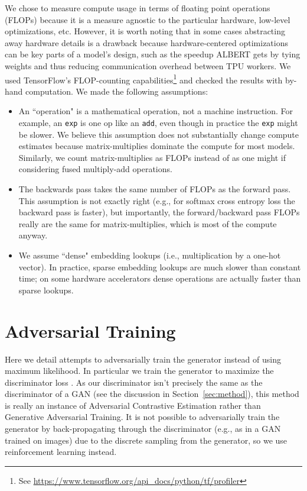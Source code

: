 \documentclass{article}
\begin{document}
We chose to measure compute usage in terms of floating point operations (FLOPs) because it is a measure agnostic to the particular hardware, low-level optimizations, etc. 
However, it is worth noting that in some cases abstracting away hardware details is a drawback because hardware-centered optimizations can be key parts of a model's design, such as the speedup ALBERT \citep{lan2019albert} gets by tying weights and thus reducing communication overhead between TPU workers. 
We used TensorFlow's FLOP-counting capabilities\footnote{See \url{https://www.tensorflow.org/api_docs/python/tf/profiler}} and checked the results with by-hand computation. We made the following assumptions: 
\begin{itemize}
    \item An ``operation" is a mathematical operation, not a machine instruction. For example, an \texttt{exp} is one op like an \texttt{add}, even though in practice the \texttt{exp} might be slower. We believe this assumption does not substantially change compute estimates because matrix-multiplies dominate the compute for most models. Similarly, we count matrix-multiplies as  FLOPs instead of  as one might if considering fused multiply-add operations. 
    \item The backwards pass takes the same number of FLOPs as the forward pass. This assumption is not exactly right (e.g., for softmax cross entropy loss the backward pass is faster), but importantly, the forward/backward pass FLOPs really are the same for matrix-multiplies, which is most of the compute anyway.
    \item We assume ``dense" embedding lookups (i.e., multiplication by a one-hot vector). In practice, sparse embedding lookups are much slower than constant time; on some hardware accelerators dense operations are actually faster than sparse lookups.
\end{itemize}


\section{Adversarial Training}
\label{app:adv}
Here we detail attempts to adversarially train the generator instead of using maximum likelihood.
In particular we train the generator  to maximize the discriminator loss .
As our discriminator isn't precisely the same as the discriminator of a GAN (see the discussion in Section~\ref{sec:method}), this method is really an instance of Adversarial Contrastive Estimation \citep{Bose2018AdversarialCE} rather than Generative Adversarial Training.
It is not possible to adversarially train the generator by back-propagating through the discriminator (e.g., as in a GAN trained on images) due to the discrete sampling from the generator, so we use reinforcement learning instead. 
\end{document}
